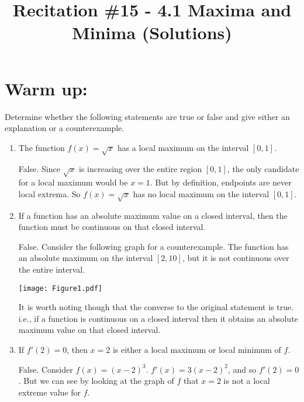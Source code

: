 \documentclass[nooutcomes]{ximera}
\title{Recitation \#15 - 4.1 Maxima and Minima (Solutions)}
\begin{document}
\begin{abstract}		\end{abstract}
\maketitle

\section*{Warm up:} 
Determine whether the following statements are true or false and give either an explanation or a counterexample.

	\begin{enumerate}
	
	\item  The function $f(x) = \sqrt{x}$ has a local maximum on the interval $[0,1]$.
		\begin{freeResponse}
		False.  Since $\sqrt{x}$ is increasing over the entire region $[0,1]$, the only candidate for a local maximum would be $x=1$.  But by definition, endpoints are never local extrema.  So $f(x) = \sqrt{x}$ has no local maximum on the interval $[0,1]$.
		\end{freeResponse}	
		
		
		
	\item  If a function has an absolute maximum value on a closed interval, then the function must be continuous on that closed interval.  
		\begin{freeResponse}
		False.  Consider the following graph for a counterexample.  The function has an absolute maximum on the interval $[2,10]$, but it is not continuous over the entire interval.
		
		\begin{image}
		\texttt{[image: Figure1.pdf]}
		\end{image}
		
		It is worth noting though that the converse to the original statement is true.  i.e., if a function is continuous on a closed interval then it obtains an absolute maximum value on that closed interval.

		\end{freeResponse}	
		
		
		
	\item  If $f'(2)=0$, then $x=2$ is either a local maximum or local minimum of $f$.
		\begin{freeResponse}
		False.  Consider $f(x) = (x-2)^3$.  $f'(x) = 3(x-2)^2$, and so $f'(2) = 0$.  But we can see by looking at the graph of $f$ that $x=2$ is not a local extreme value for $f$.
		

\end{freeResponse}
\end{enumerate}
\end{document}
